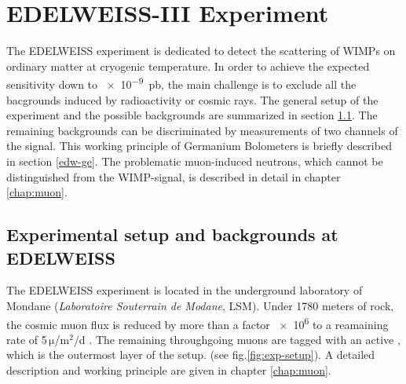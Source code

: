 
\section{EDELWEISS-III Experiment}
  \label{edw}
  The EDELWEISS experiment is dedicated to detect the scattering of WIMPs on ordinary matter at cryogenic temperature. In order to achieve the expected sensitivity down to \SI{e-9}{pb}, the main challenge is to exclude all the bacgrounds induced by radioactivity or cosmic rays. The general setup of the experiment and the possible backgrounds are summarized in section \ref{sec:edw-exp}. The remaining backgrounds can be discriminated by measurements of two channels of the signal. This working principle of Germanium Bolometers is briefly described in section \ref{edw-ge}.
  The problematic muon-induced neutrons, which cannot be distinguished from the WIMP-signal, is described in detail in chapter \ref{chap:muon}.
\subsection{Experimental setup and backgrounds at EDELWEISS}
  \label{sec:edw-exp}
  The EDELWEISS experiment is located in the underground laboratory of Mondane (\textit{Laboratoire Souterrain de Modane}, LSM). Under 1780 meters of rock, the cosmic muon flux is reduced by more than a factor \num{e6} to a reamaining rate of 5\,$\mathrm{\mu}$/$\mathrm{m}^{2}$/d \cite{Sch13a}.
  The remaining throughgoing muons are tagged with an active \mvs, which is the outermost layer of the setup. (see fig.\ref{fig:exp-setup}). A detailed description and working principle are given in chapter \ref{chap:muon}.

